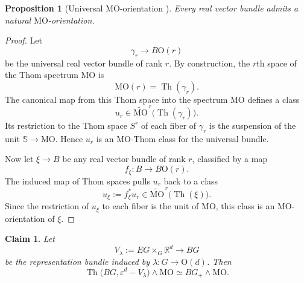 \documentclass[aps,prx,reprint,superscriptaddress,twocolumn,amsmath,amssymb,amsfonts, nofootinbib]{revtex4-2}
\theoremstyle{apsstyle}
\newtheorem{proposition}[theorem]{Proposition}
\newtheorem{claim}{Claim}
\begin{document}
\bigskip

\begin{proposition}[Universal $\mathrm{MO}$-orientation
{\cite[Chs.~4-5]{Stong_unorCob}}]
\label{prop:universal_MO_orientation}
Every real vector bundle admits a natural $\mathrm{MO}$-orientation.
\end{proposition}

\begin{proof}
Let
\begin{equation*}
    \gamma_r
    \longrightarrow
    B\mathrm O(r)
\end{equation*}
be the universal real vector bundle of rank $r$. By construction, the
$r$th space of the Thom spectrum $\mathrm{MO}$ is
\begin{equation*}
    \mathrm{MO}(r)
    =
    \operatorname{Th}(\gamma_r).
\end{equation*}
The canonical map from this Thom space into the spectrum $\mathrm{MO}$
defines a class
\begin{equation*}
    u_r
    \in
    \widetilde{\mathrm{MO}}^{\,r}
    \bigl(\operatorname{Th}(\gamma_r)\bigr).
\end{equation*}
Its restriction to the Thom space $S^r$ of each fiber of $\gamma_r$ is
the suspension of the unit
$\mathbb S\to\mathrm{MO}$. Hence $u_r$ is an
$\mathrm{MO}$-Thom class for the universal bundle.

Now let $\xi\to B$ be any real vector bundle of rank $r$, classified by
a map
\begin{equation*}
    f_{\xi}:
    B\longrightarrow B\mathrm O(r).
\end{equation*}
The induced map of Thom spaces pulls $u_r$ back to a class
\begin{equation*}
    u_{\xi}
    :=
    f_{\xi}^{*}u_r
    \in
    \widetilde{\mathrm{MO}}^{\,r}
    \bigl(\operatorname{Th}(\xi)\bigr).
\end{equation*}
Since the restriction of $u_{\xi}$ to each fiber is the unit of
$\mathrm{MO}$, this class is an $\mathrm{MO}$-orientation of $\xi$.
\end{proof}

\bigskip 

\begin{claim}
\label{claim:MO_representation_bundle_untwisting}
Let
\begin{equation*}
    V_{\lambda}
    :=
    EG\times_G\mathbb R^d
    \longrightarrow
    BG
\end{equation*}
be the representation bundle induced by
$\lambda:G\to\mathrm O(d)$. Then
\begin{equation}
    \operatorname{Th}
    \bigl(BG,\varepsilon^d-V_{\lambda}\bigr)
    \wedge\mathrm{MO}
    \simeq
    BG_+\wedge\mathrm{MO}.
    \label{eq:MO_representation_bundle_untwisting}
\end{equation}
\end{claim}
\end{document}
